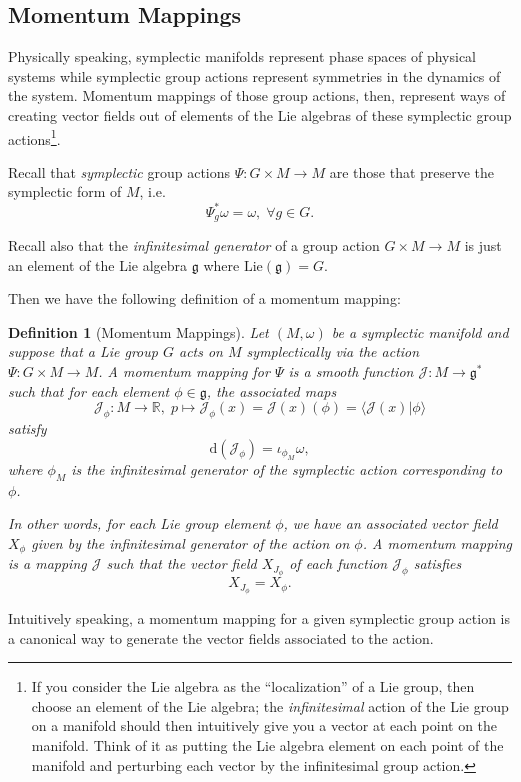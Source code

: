 \documentclass{tufte-handout}
\newtheorem{defn}{Definition}
\begin{document}
\subsection{Momentum Mappings}
Physically speaking, symplectic manifolds represent phase spaces of physical systems while symplectic group actions represent symmetries in the dynamics of the system. Momentum mappings of those group actions, then, represent ways of creating vector fields out of elements of the Lie algebras of these symplectic group actions\footnote{If you consider the Lie algebra as the ``localization'' of a Lie group, then choose an element of the Lie algebra; the \emph{infinitesimal} action of the Lie group on a manifold should then intuitively give you a vector at each point on the manifold. Think of it as putting the Lie algebra element on each point of the manifold and perturbing each vector by the infinitesimal group action.}.

Recall that \emph{symplectic} group actions $\Psi : G \times M \to M$ are those that preserve the symplectic form of $M$, i.e.
$$
\Psi^*_g \omega = \omega, \; \forall g \in G.
$$

Recall also that the \emph{infinitesimal generator} of a group action $G \times M \to M$ is just an element of the Lie algebra $\mathfrak{g}$ where $\mathrm{Lie}(\mathfrak{g}) = G$.

Then we have the following definition of a momentum mapping:
\begin{fullwidth}
\begin{defn}[Momentum Mappings]
Let $(M,\omega)$ be a symplectic manifold and suppose that a Lie group $G$ acts on $M$ symplectically via the action $\Psi: G \times M \to M$. A \emph{momentum mapping} for $\Psi$ is a smooth function $\mathcal{J}: M \to \mathfrak{g}^*$ such that for each element $\phi \in \mathfrak{g}$, the associated maps
$$
\mathcal{J}_\phi : M \to \mathbb{R}, \; p \mapsto \mathcal{J}_\phi(x) = \mathcal{J}(x)(\phi) = \langle \mathcal{J}(x) | \phi \rangle
$$
satisfy
$$
\mathrm{d}(\mathcal{J}_\phi) = \iota_{\phi_M} \omega,
$$
where $\phi_M$ is the infinitesimal generator of the symplectic action corresponding to $\phi$.

In other words, for each Lie group element $\phi$, we have an associated vector field $X_\phi$ given by the infinitesimal generator of the action on $\phi$. A momentum mapping is a mapping $\mathcal{J}$ such that the vector field $X_{J_\phi}$ of each function $\mathcal{J}_\phi$ satisfies
$$
X_{J_\phi} = X_\phi.
$$
\end{defn}
\end{fullwidth}
Intuitively speaking, a momentum mapping for a given symplectic group action is a canonical way to generate the vector fields associated to the action.
\end{document}
